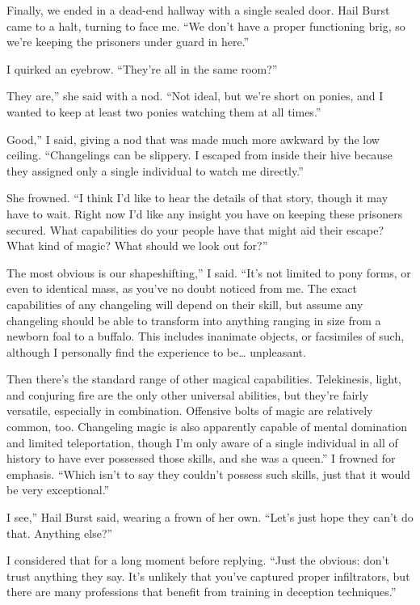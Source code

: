Finally, we ended in a dead-end hallway with a single sealed door. Hail Burst came to a halt, turning to face me. “We don’t have a proper functioning brig, so we’re keeping the prisoners under guard in here.”

I quirked an eyebrow. “They’re all in the same room?”

\leavevmode{}They are,” she said with a nod. “Not ideal, but we’re short on ponies, and I wanted to keep at least two ponies watching them at all times.”

\leavevmode{}Good,” I said, giving a nod that was made much more awkward by the low ceiling. “Changelings can be slippery. I escaped from inside their hive because they assigned only a single individual to watch me directly.”

She frowned. “I think I’d like to hear the details of that story, though it may have to wait. Right now I’d like any insight you have on keeping these prisoners secured. What capabilities do your people have that might aid their escape? What kind of magic? What should we look out for?”

\leavevmode{}The most obvious is our shapeshifting,” I said. “It’s not limited to pony forms, or even to identical mass, as you’ve no doubt noticed from me. The exact capabilities of any changeling will depend on their skill, but assume any changeling should be able to transform into anything ranging in size from a newborn foal to a buffalo. This includes inanimate objects, or facsimiles of such, although I personally find the experience to be… unpleasant.

\leavevmode{}Then there’s the standard range of other magical capabilities. Telekinesis, light, and conjuring fire are the only other universal abilities, but they’re fairly versatile, especially in combination. Offensive bolts of magic are relatively common, too. Changeling magic is also apparently capable of mental domination and limited teleportation, though I’m only aware of a single individual in all of history to have ever possessed those skills, and she was a queen.” I frowned for emphasis. “Which isn’t to say they couldn’t possess such skills, just that it would be very exceptional.”

\leavevmode{}I see,” Hail Burst said, wearing a frown of her own. “Let’s just hope they can’t do that. Anything else?”

I considered that for a long moment before replying. “Just the obvious: don’t trust anything they say. It’s unlikely that you’ve captured proper infiltrators, but there are many professions that benefit from training in deception techniques.”


